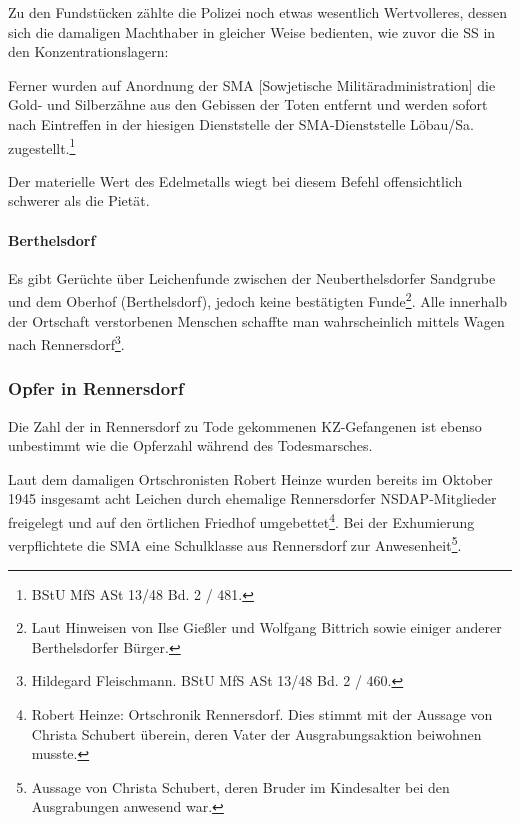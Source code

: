 \documentclass[a4paper,12pt,ngerman,
]{nisebook}
\begin{document}
Zu den Fundstücken zählte die Polizei noch etwas wesentlich Wertvolleres, dessen sich die damaligen Machthaber in gleicher Weise bedienten, wie zuvor die SS in den Konzentrationslagern:

\begin{leftbar} 
Ferner wurden auf Anordnung der SMA [Sowjetische Militäradministration] die Gold- und Silberzähne aus den Gebissen der Toten entfernt und werden sofort nach Eintreffen in der hiesigen Dienststelle der SMA-Dienststelle Löbau/Sa. zugestellt.\footnote{BStU MfS ASt 13/48 Bd. 2 / 481.}
\end{leftbar} 
Der materielle Wert des Edelmetalls wiegt bei diesem Befehl offensichtlich schwerer als die Pietät.

\paragraph{Berthelsdorf}
Es gibt Gerüchte über Leichenfunde zwischen der Neuberthelsdorfer Sandgrube und dem Oberhof (Berthelsdorf), jedoch keine bestätigten Funde\footnote{Laut Hinweisen von Ilse Gießler und Wolfgang Bittrich sowie einiger anderer Berthelsdorfer Bürger.}. Alle innerhalb der Ortschaft verstorbenen Menschen schaffte man wahrscheinlich mittels Wagen nach Rennersdorf\footnote{Hildegard Fleischmann. BStU MfS ASt 13/48 Bd. 2 / 460.}.


\subsubsection{Opfer in Rennersdorf}
Die Zahl der in Rennersdorf zu Tode gekommenen KZ-Gefangenen ist ebenso unbestimmt wie die Opferzahl während des Todesmarsches. 

Laut dem damaligen Ortschronisten Robert Heinze wurden bereits im Oktober 1945 insgesamt acht Leichen durch ehemalige Rennersdorfer NSDAP-Mitglieder freigelegt und auf den örtlichen Friedhof umgebettet\footnote{Robert Heinze: Ortschronik Rennersdorf. Dies stimmt mit der Aussage von Christa Schubert überein, deren Vater der Ausgrabungsaktion beiwohnen musste.}. Bei der Exhumierung verpflichtete die SMA eine Schulklasse aus Rennersdorf zur Anwesenheit\footnote{Aussage von Christa Schubert, deren Bruder im Kindesalter bei den Ausgrabungen anwesend war.}.
\end{document}
